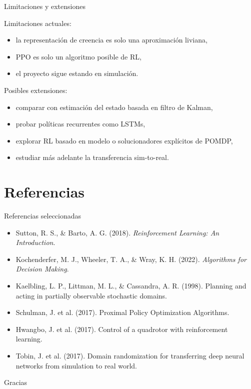\documentclass[11pt]{beamer}
\begin{document}

\begin{frame}{Limitaciones y extensiones}

Limitaciones actuales:
\begin{itemize}
  \item la representación de creencia es solo una aproximación liviana,
  \item PPO es solo un algoritmo posible de RL,
  \item el proyecto sigue estando en simulación.
\end{itemize}

\medskip
Posibles extensiones:
\begin{itemize}
  \item comparar con estimación del estado basada en filtro de Kalman,
  \item probar políticas recurrentes como LSTMs,
  \item explorar RL basado en modelo o solucionadores explícitos de POMDP,
  \item estudiar más adelante la transferencia sim-to-real.
\end{itemize}
\end{frame}


\section{Referencias}


\begin{frame}{Referencias seleccionadas}
\footnotesize
\begin{itemize}
  \item Sutton, R. S., \& Barto, A. G. (2018). \textit{Reinforcement Learning: An Introduction}.
  \item Kochenderfer, M. J., Wheeler, T. A., \& Wray, K. H. (2022). \textit{Algorithms for Decision Making}.
  \item Kaelbling, L. P., Littman, M. L., \& Cassandra, A. R. (1998). Planning and acting in partially observable stochastic domains.
  \item Schulman, J. et al. (2017). Proximal Policy Optimization Algorithms.
  \item Hwangbo, J. et al. (2017). Control of a quadrotor with reinforcement learning.
  \item Tobin, J. et al. (2017). Domain randomization for transferring deep neural networks from simulation to real world.
\end{itemize}
\end{frame}


\begin{frame}
  \centering
  \Huge Gracias
\end{frame}
\end{document}
